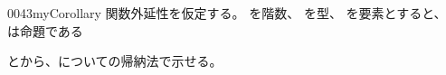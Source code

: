 \documentclass[index]{subfiles}
\begin{document}
\begin{myBlock}{0043}{myCorollary}
  関数外延性を仮定する。
  を階数、
  を型、
  を要素とすると、
  は命題である
\end{myBlock}
\begin{myProof}
  とから、についての帰納法で示せる。
\end{myProof}
\end{document}
